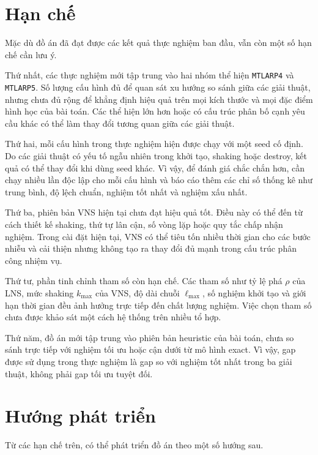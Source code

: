 \section{Hạn chế}
\label{sec:conclusion-limitations}

Mặc dù đồ án đã đạt được các kết quả thực nghiệm ban đầu, vẫn còn một số hạn chế cần lưu ý.

Thứ nhất, các thực nghiệm mới tập trung vào hai nhóm thể hiện \texttt{MTLARP4} và \texttt{MTLARP5}. Số lượng cấu hình đủ để quan sát xu hướng so sánh giữa các giải thuật, nhưng chưa đủ rộng để khẳng định hiệu quả trên mọi kích thước và mọi đặc điểm hình học của bài toán. Các thể hiện lớn hơn hoặc có cấu trúc phân bố cạnh yêu cầu khác có thể làm thay đổi tương quan giữa các giải thuật.

Thứ hai, mỗi cấu hình trong thực nghiệm hiện được chạy với một seed cố định. Do các giải thuật có yếu tố ngẫu nhiên trong khởi tạo, shaking hoặc destroy, kết quả có thể thay đổi khi dùng seed khác. Vì vậy, để đánh giá chắc chắn hơn, cần chạy nhiều lần độc lập cho mỗi cấu hình và báo cáo thêm các chỉ số thống kê như trung bình, độ lệch chuẩn, nghiệm tốt nhất và nghiệm xấu nhất.

Thứ ba, phiên bản VNS hiện tại chưa đạt hiệu quả tốt. Điều này có thể đến từ cách thiết kế shaking, thứ tự lân cận, số vòng lặp hoặc quy tắc chấp nhận nghiệm. Trong cài đặt hiện tại, VNS có thể tiêu tốn nhiều thời gian cho các bước nhiễu và cải thiện nhưng không tạo ra thay đổi đủ mạnh trong cấu trúc phân công nhiệm vụ.

Thứ tư, phần tinh chỉnh tham số còn hạn chế. Các tham số như tỷ lệ phá \(\rho\) của LNS, mức shaking \(k_{\max}\) của VNS, độ dài chuỗi \(\ell_{\max}\), số nghiệm khởi tạo và giới hạn thời gian đều ảnh hưởng trực tiếp đến chất lượng nghiệm. Việc chọn tham số chưa được khảo sát một cách hệ thống trên nhiều tổ hợp.

Thứ năm, đồ án mới tập trung vào phiên bản heuristic của bài toán, chưa so sánh trực tiếp với nghiệm tối ưu hoặc cận dưới từ mô hình exact. Vì vậy, gap được sử dụng trong thực nghiệm là gap so với nghiệm tốt nhất trong ba giải thuật, không phải gap tối ưu tuyệt đối.

\section{Hướng phát triển}
\label{sec:conclusion-future-work}

Từ các hạn chế trên, có thể phát triển đồ án theo một số hướng sau.

